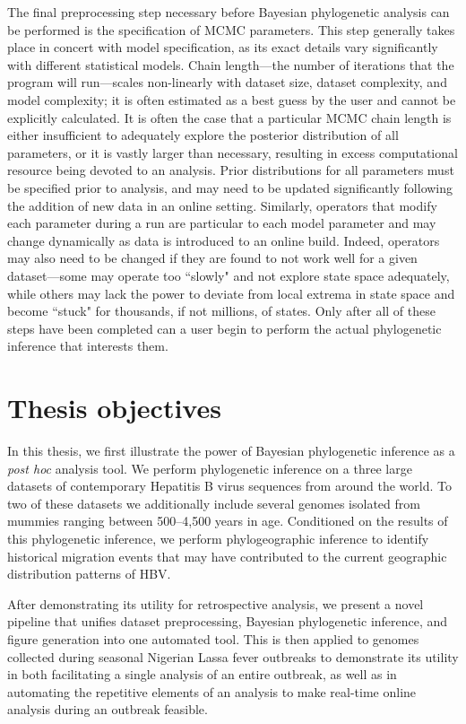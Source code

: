 The final preprocessing step necessary before Bayesian phylogenetic analysis can be performed is the specification of MCMC parameters.
This step generally takes place in concert with model specification, as its exact details vary significantly with different statistical models.
Chain length---the number of iterations that the program will run---scales non-linearly with dataset size, dataset complexity, and model complexity; it is often estimated as a best guess by the user and cannot be explicitly calculated.
It is often the case that a particular MCMC chain length is either insufficient to adequately explore the posterior distribution of all parameters, or it is vastly larger than necessary, resulting in excess computational resource being devoted to an analysis.
Prior distributions for all parameters must be specified prior to analysis, and may need to be updated significantly following the addition of new data in an online setting.
Similarly, operators that modify each parameter during a run are particular to each model parameter and may change dynamically as data is introduced to an online build.
Indeed, operators may also need to be changed if they are found to not work well for a given dataset---some may operate too ``slowly" and not explore state space adequately, while others may lack the power to deviate from local extrema in state space and become ``stuck" for thousands, if not millions, of states.
Only after all of these steps have been completed can a user begin to perform the actual phylogenetic inference that interests them.


\section{Thesis objectives}

In this thesis, we first illustrate the power of Bayesian phylogenetic inference as a \textit{post hoc} analysis tool.
We perform phylogenetic inference on a three large datasets of contemporary Hepatitis B virus sequences from around the world.
To two of these datasets we additionally include several genomes isolated from mummies ranging between 500--4,500 years in age.
Conditioned on the results of this phylogenetic inference, we perform phylogeographic inference to identify historical migration events that may have contributed to the current geographic distribution patterns of HBV. %

After demonstrating its utility for retrospective analysis, we present a novel pipeline that unifies dataset preprocessing, Bayesian phylogenetic inference, and figure generation into one automated tool.
This is then applied to genomes collected during seasonal Nigerian Lassa fever outbreaks to demonstrate its utility in both facilitating a single analysis of an entire outbreak, as well as in automating the repetitive elements of an analysis to make real-time online analysis during an outbreak feasible. %

